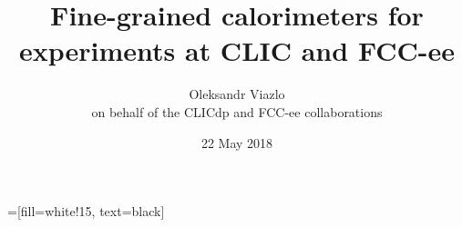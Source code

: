 \documentclass[8pt]{beamer}
\newif\ifplacelogo %
\begin{document}
\newcommand{\myNode}{\tikz[baseline,inner sep=1pt] \node[anchor=base]}

 =[fill=white!15, text=black]



\title[Fine-grained calorimeters for experiments at CLIC and FCC-ee \hspace{2.0em}\insertframenumber/
\inserttotalframenumber]{ Fine-grained calorimeters for experiments at CLIC and FCC-ee }


	\author[Oleksandr Viazlo]{Oleksandr Viazlo\\ 
	{\small on behalf of the CLICdp and FCC-ee collaborations}
	}
	
       
	\date{22 May 2018}


	
   	\frame{\titlepage}

   	

\placelogofalse
\end{document}
